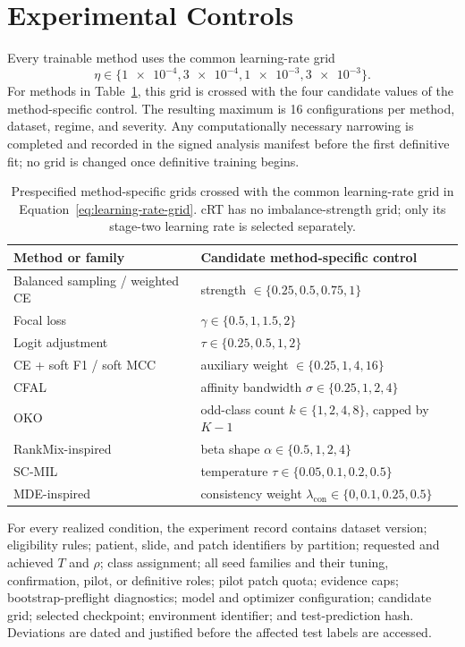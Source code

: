 \documentclass[11pt]{article}
\begin{document}
\appendix
\section{Experimental Controls}
\label{app:controls}
Every trainable method uses the common learning-rate grid
\begin{equation}
  \eta\in\{\num{1e-4},\num{3e-4},\num{1e-3},\num{3e-3}\}.
  \label{eq:learning-rate-grid}
\end{equation}
\noindent For methods in Table~\ref{tab:controls}, this grid is crossed with the four candidate values of the method-specific control. The resulting maximum is 16 configurations per method, dataset, regime, and severity. Any computationally necessary narrowing is completed and recorded in the signed analysis manifest before the first definitive fit; no grid is changed once definitive training begins.

\begin{table}[H]
  \centering
  \footnotesize
  \begin{tabularx}{\linewidth}{@{}lX@{}}
    \toprule
    Method or family & Candidate method-specific control \\
    \midrule
    Balanced sampling / weighted CE & strength $\in\{0.25,0.5,0.75,1\}$ \\
    Focal loss & $\gamma\in\{0.5,1,1.5,2\}$ \\
    Logit adjustment & $\tau\in\{0.25,0.5,1,2\}$ \\
    CE + soft F1 / soft MCC & auxiliary weight $\in\{0.25,1,4,16\}$ \\
    CFAL & affinity bandwidth $\sigma\in\{0.25,1,2,4\}$ \\
    OKO & odd-class count $k\in\{1,2,4,8\}$, capped by $K-1$ \\
    RankMix-inspired & beta shape $\alpha\in\{0.5,1,2,4\}$ \\
    SC-MIL & temperature $\tau\in\{0.05,0.1,0.2,0.5\}$ \\
    MDE-inspired & consistency weight $\lambda_{\mathrm{con}}\in\{0,0.1,0.25,0.5\}$ \\
    \bottomrule
  \end{tabularx}
  \caption{Prespecified method-specific grids crossed with the common learning-rate grid in Equation~\eqref{eq:learning-rate-grid}. cRT has no imbalance-strength grid; only its stage-two learning rate is selected separately.}
  \label{tab:controls}
\end{table}

For every realized condition, the experiment record contains dataset version; eligibility rules; patient, slide, and patch identifiers by partition; requested and achieved $T$ and $\rho$; class assignment; all seed families and their tuning, confirmation, pilot, or definitive roles; pilot patch quota; evidence caps; bootstrap-preflight diagnostics; model and optimizer configuration; candidate grid; selected checkpoint; environment identifier; and test-prediction hash. Deviations are dated and justified before the affected test labels are accessed.
\end{document}
